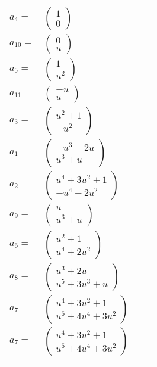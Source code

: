 \documentclass[1p]{elsarticle_modified}
\theoremstyle{definition}
\begin{document}
\begin{tabular}{m{7pt} m{180pt} m{7pt} m{180pt} }
\flushright $a_{4}=$&$\begin{pmatrix}1\\0\end{pmatrix}$ \\
\flushright $a_{10}=$&$\begin{pmatrix}0\\u\end{pmatrix}$ \\
\flushright $a_{5}=$&$\begin{pmatrix}1\\u^2\end{pmatrix}$ \\
\flushright $a_{11}=$&$\begin{pmatrix}- u\\u\end{pmatrix}$ \\
\flushright $a_{3}=$&$\begin{pmatrix}u^2+1\\- u^2\end{pmatrix}$ \\
\flushright $a_{1}=$&$\begin{pmatrix}- u^3-2 u\\u^3+u\end{pmatrix}$ \\
\flushright $a_{2}=$&$\begin{pmatrix}u^4+3 u^2+1\\- u^4-2 u^2\end{pmatrix}$ \\
\flushright $a_{9}=$&$\begin{pmatrix}u\\u^3+u\end{pmatrix}$ \\
\flushright $a_{6}=$&$\begin{pmatrix}u^2+1\\u^4+2 u^2\end{pmatrix}$ \\
\flushright $a_{8}=$&$\begin{pmatrix}u^3+2 u\\u^5+3 u^3+u\end{pmatrix}$ \\
\flushright $a_{7}=$&$\begin{pmatrix}u^4+3 u^2+1\\u^6+4 u^4+3 u^2\end{pmatrix}$\\ \flushright $a_{7}=$&$\begin{pmatrix}u^4+3 u^2+1\\u^6+4 u^4+3 u^2\end{pmatrix}$\\&\end{tabular}
\end{document}
